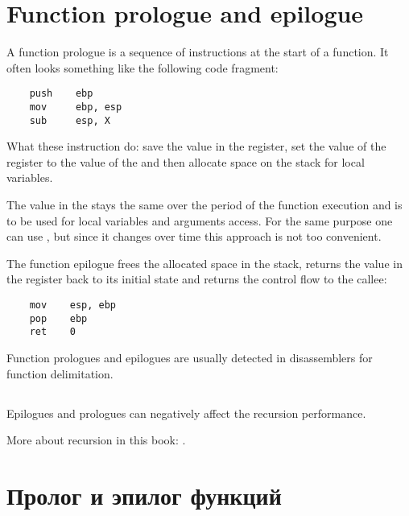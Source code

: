 \ifdefined\ENGLISH
\chapter{Function prologue and epilogue}
\label{sec:prologepilog}

A function prologue is a sequence of instructions at the start of a function. It often looks something like the following code fragment:

\begin{lstlisting}
    push    ebp
    mov     ebp, esp
    sub     esp, X
\end{lstlisting}

What these instruction do: save the value in the \EBP register,
set the value of the \EBP register to the value of the \ESP and then allocate space on the stack 
for local variables.

The value in the \EBP stays the same over the period of the function execution and is to be used for local variables and 
arguments access. 
For the same purpose one can use \ESP, but since it changes over time this approach is not too convenient.

The function epilogue frees the allocated space in the stack, returns the value in the \EBP register back to its initial state 
and returns the control flow to the \gls{callee}:

\begin{lstlisting}
    mov    esp, ebp
    pop    ebp
    ret    0
\end{lstlisting}

Function prologues and epilogues are usually detected in disassemblers for function delimitation.

\ifx\LITE\undefined
\section{\Recursion}

\index{\Recursion}
Epilogues and prologues can negatively affect the recursion performance.

More about recursion in this book: .
\fi %
\fi %

\ifdefined\RUSSIAN
\chapter{Пролог и эпилог функций}
\label{sec:prologepilog}

